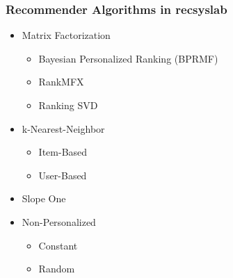 \documentclass[mathserif,svgnames]{beamer}
\begin{document}
\begin{frame}
    \frametitle{Recommender Algorithms in recsyslab}\pause
    \begin{itemize}
        \item Matrix Factorization~\cite{matrixfactorization}
            \begin{itemize}
                \item Bayesian Personalized Ranking (BPRMF)~\cite{Rendle:2009:BBP:1795114.1795167}
                \item RankMFX~\cite{diaz2012happening}
                \item Ranking SVD~\cite{jahrer2011collaborative}
            \end{itemize}\pause
        \item k-Nearest-Neighbor\cite{Karypis:2001:EIT:502585.502627}
            \begin{itemize}
                \item Item-Based
                \item User-Based
            \end{itemize}\pause
		  \item Slope One~\cite{DBLP:journals/corr/abs-cs-0702144}\pause
        \item Non-Personalized
            \begin{itemize}
                \item Constant
                \item Random
            \end{itemize}
    \end{itemize}

\end{frame}
\end{document}

